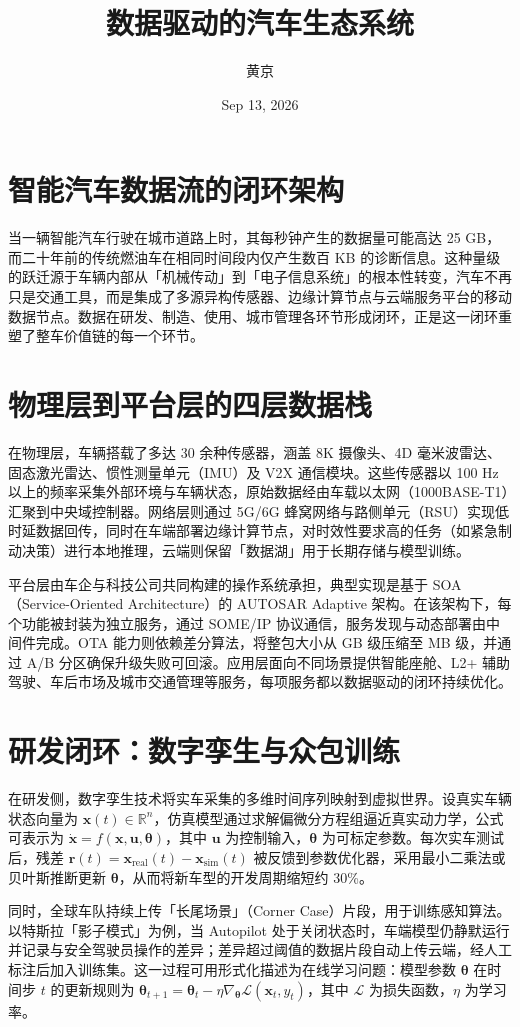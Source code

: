 \title{数据驱动的汽车生态系统}
\author{黄京}
\date{Sep 13, 2026}
\maketitle
\chapter{智能汽车数据流的闭环架构}
当一辆智能汽车行驶在城市道路上时，其每秒钟产生的数据量可能高达 25 GB，而二十年前的传统燃油车在相同时间段内仅产生数百 KB 的诊断信息。这种量级的跃迁源于车辆内部从「机械传动」到「电子信息系统」的根本性转变，汽车不再只是交通工具，而是集成了多源异构传感器、边缘计算节点与云端服务平台的移动数据节点。数据在研发、制造、使用、城市管理各环节形成闭环，正是这一闭环重塑了整车价值链的每一个环节。\par
\chapter{物理层到平台层的四层数据栈}
在物理层，车辆搭载了多达 30 余种传感器，涵盖 8K 摄像头、4D 毫米波雷达、固态激光雷达、惯性测量单元（IMU）及 V2X 通信模块。这些传感器以 100 Hz 以上的频率采集外部环境与车辆状态，原始数据经由车载以太网（1000BASE-T1）汇聚到中央域控制器。网络层则通过 5G/6G 蜂窝网络与路侧单元（RSU）实现低时延数据回传，同时在车端部署边缘计算节点，对时效性要求高的任务（如紧急制动决策）进行本地推理，云端则保留「数据湖」用于长期存储与模型训练。\par
平台层由车企与科技公司共同构建的操作系统承担，典型实现是基于 SOA（Service-Oriented Architecture）的 AUTOSAR Adaptive 架构。在该架构下，每个功能被封装为独立服务，通过 SOME/IP 协议通信，服务发现与动态部署由中间件完成。OTA 能力则依赖差分算法，将整包大小从 GB 级压缩至 MB 级，并通过 A/B 分区确保升级失败可回滚。应用层面向不同场景提供智能座舱、L2+ 辅助驾驶、车后市场及城市交通管理等服务，每项服务都以数据驱动的闭环持续优化。\par
\chapter{研发闭环：数字孪生与众包训练}
在研发侧，数字孪生技术将实车采集的多维时间序列映射到虚拟世界。设真实车辆状态向量为 $\mathbf{x}(t) \in \mathbb{R}^n$，仿真模型通过求解偏微分方程组逼近真实动力学，公式可表示为 $\dot{\mathbf{x}} = f(\mathbf{x}, \mathbf{u}, \boldsymbol{\theta})$，其中 $\mathbf{u}$ 为控制输入，$\boldsymbol{\theta}$ 为可标定参数。每次实车测试后，残差 $\mathbf{r}(t) = \mathbf{x}_{\text{real}}(t) - \mathbf{x}_{\text{sim}}(t)$ 被反馈到参数优化器，采用最小二乘法或贝叶斯推断更新 $\boldsymbol{\theta}$，从而将新车型的开发周期缩短约 30\%{}。\par
同时，全球车队持续上传「长尾场景」（Corner Case）片段，用于训练感知算法。以特斯拉「影子模式」为例，当 Autopilot 处于关闭状态时，车端模型仍静默运行并记录与安全驾驶员操作的差异；差异超过阈值的数据片段自动上传云端，经人工标注后加入训练集。这一过程可用形式化描述为在线学习问题：模型参数 $\boldsymbol{\theta}$ 在时间步 $t$ 的更新规则为 $\boldsymbol{\theta}_{t+1} = \boldsymbol{\theta}_t - \eta \nabla _{\boldsymbol{\theta}} \mathcal{L}(\mathbf{x}_t, y_t)$，其中 $\mathcal{L}$ 为损失函数，$\eta$ 为学习率。\par
